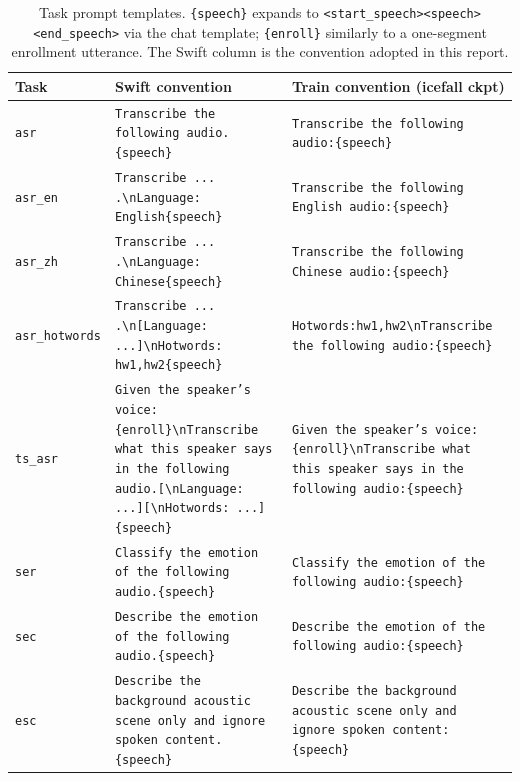 \begin{table}[t]
  \caption{Task prompt templates. \texttt{\{speech\}} expands to
    \texttt{<start\_speech><speech><end\_speech>} via the chat
    template; \texttt{\{enroll\}} similarly to a one-segment
    enrollment utterance. The Swift column is the convention adopted
    in this report.}
  \label{tab:tasks}
  \centering
  \scriptsize
  \setlength{\tabcolsep}{4pt}
  \begin{tabular}{lp{6.0cm}p{5.4cm}}
    \toprule
    Task & Swift convention & Train convention (icefall ckpt) \\
    \midrule
    \texttt{asr}            & \texttt{Transcribe the following audio.\{speech\}}                  & \texttt{Transcribe the following audio:\{speech\}} \\
    \texttt{asr\_en}        & \texttt{Transcribe ... .\textbackslash nLanguage: English\{speech\}} & \texttt{Transcribe the following English audio:\{speech\}} \\
    \texttt{asr\_zh}        & \texttt{Transcribe ... .\textbackslash nLanguage: Chinese\{speech\}} & \texttt{Transcribe the following Chinese audio:\{speech\}} \\
    \texttt{asr\_hotwords}  & \texttt{Transcribe ... .\textbackslash n[Language: ...]\textbackslash nHotwords:\,hw1,hw2\{speech\}} & \texttt{Hotwords:hw1,hw2\textbackslash nTranscribe the following audio:\{speech\}} \\
    \texttt{ts\_asr}        & \texttt{Given the speaker's voice:\{enroll\}\textbackslash nTranscribe what this speaker says in the following audio.[\textbackslash nLanguage: ...][\textbackslash nHotwords: ...]\{speech\}} & \texttt{Given the speaker's voice:\{enroll\}\textbackslash nTranscribe what this speaker says in the following audio:\{speech\}} \\
    \texttt{ser}            & \texttt{Classify the emotion of the following audio.\{speech\}}     & \texttt{Classify the emotion of the following audio:\{speech\}} \\
    \texttt{sec}            & \texttt{Describe the emotion of the following audio.\{speech\}}     & \texttt{Describe the emotion of the following audio:\{speech\}} \\
    \texttt{esc}            & \texttt{Describe the background acoustic scene only and ignore spoken content.\{speech\}} & \texttt{Describe the background acoustic scene only and ignore spoken content:\{speech\}} \\
    \bottomrule
  \end{tabular}
\end{table}

